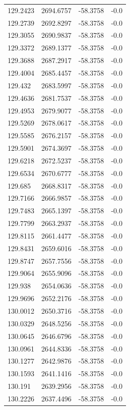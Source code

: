 \begin{table}[H]
\begin{tabular}{llll}
129.2423 & 2694.6757 & -58.3758 & -0.0 \\
129.2739 & 2692.8297 & -58.3758 & -0.0 \\
129.3055 & 2690.9837 & -58.3758 & -0.0 \\
129.3372 & 2689.1377 & -58.3758 & -0.0 \\
129.3688 & 2687.2917 & -58.3758 & -0.0 \\
129.4004 & 2685.4457 & -58.3758 & -0.0 \\
129.432 & 2683.5997 & -58.3758 & -0.0 \\
129.4636 & 2681.7537 & -58.3758 & -0.0 \\
129.4953 & 2679.9077 & -58.3758 & -0.0 \\
129.5269 & 2678.0617 & -58.3758 & -0.0 \\
129.5585 & 2676.2157 & -58.3758 & -0.0 \\
129.5901 & 2674.3697 & -58.3758 & -0.0 \\
129.6218 & 2672.5237 & -58.3758 & -0.0 \\
129.6534 & 2670.6777 & -58.3758 & -0.0 \\
129.685 & 2668.8317 & -58.3758 & -0.0 \\
129.7166 & 2666.9857 & -58.3758 & -0.0 \\
129.7483 & 2665.1397 & -58.3758 & -0.0 \\
129.7799 & 2663.2937 & -58.3758 & -0.0 \\
129.8115 & 2661.4477 & -58.3758 & -0.0 \\
129.8431 & 2659.6016 & -58.3758 & -0.0 \\
129.8747 & 2657.7556 & -58.3758 & -0.0 \\
129.9064 & 2655.9096 & -58.3758 & -0.0 \\
129.938 & 2654.0636 & -58.3758 & -0.0 \\
129.9696 & 2652.2176 & -58.3758 & -0.0 \\
130.0012 & 2650.3716 & -58.3758 & -0.0 \\
130.0329 & 2648.5256 & -58.3758 & -0.0 \\
130.0645 & 2646.6796 & -58.3758 & -0.0 \\
130.0961 & 2644.8336 & -58.3758 & -0.0 \\
130.1277 & 2642.9876 & -58.3758 & -0.0 \\
130.1593 & 2641.1416 & -58.3758 & -0.0 \\
130.191 & 2639.2956 & -58.3758 & -0.0 \\
130.2226 & 2637.4496 & -58.3758 & -0.0 \\

\end{tabular}
\end{table}
